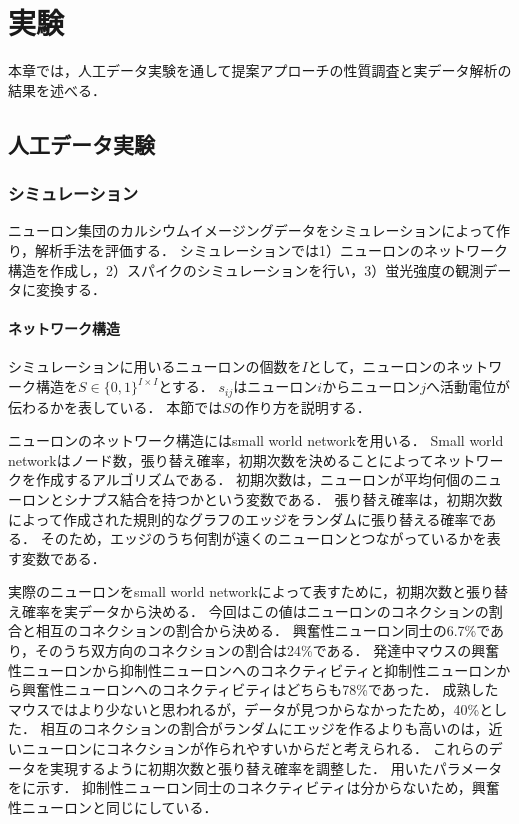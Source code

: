 \chapter{実験}
本章では，人工データ実験を通して提案アプローチの性質調査と実データ解析の結果を述べる．

\section{人工データ実験}
\subsection{シミュレーション}
ニューロン集団のカルシウムイメージングデータをシミュレーションによって作り，解析手法を評価する．
シミュレーションでは1）ニューロンのネットワーク構造を作成し，2）スパイクのシミュレーションを行い，3）蛍光強度の観測データに変換する．
\subsubsection{ネットワーク構造}
シミュレーションに用いるニューロンの個数を$I$として，ニューロンのネットワーク構造を$S \in \{0, 1\}^{I \times I}$とする．
$s_{ij}$はニューロン$i$からニューロン$j$へ活動電位が伝わるかを表している．
本節では$S$の作り方を説明する．

ニューロンのネットワーク構造にはsmall world network\cite{Watts1998}を用いる．
Small world networkはノード数，張り替え確率，初期次数を決めることによってネットワークを作成するアルゴリズムである．
初期次数は，ニューロンが平均何個のニューロンとシナプス結合を持つかという変数である．
張り替え確率は，初期次数によって作成された規則的なグラフのエッジをランダムに張り替える確率である．
そのため，エッジのうち何割が遠くのニューロンとつながっているかを表す変数である．

実際のニューロンをsmall world networkによって表すために，初期次数と張り替え確率を実データから決める．
今回はこの値はニューロンのコネクションの割合と相互のコネクションの割合から決める．
興奮性ニューロン同士の6.7\%であり，そのうち双方向のコネクションの割合は24\%である\cite{Jouhanneau2015}．
発達中マウスの興奮性ニューロンから抑制性ニューロンへのコネクティビティと抑制性ニューロンから興奮性ニューロンへのコネクティビティはどちらも78\%であった\cite{Holmgren2003}．
成熟したマウスではより少ないと思われるが，データが見つからなかったため，40\%とした．
相互のコネクションの割合がランダムにエッジを作るよりも高いのは，近いニューロンにコネクションが作られやすいからだと考えられる．
これらのデータを実現するように初期次数と張り替え確率を調整した．
用いたパラメータをに示す．
抑制性ニューロン同士のコネクティビティは分からないため，興奮性ニューロンと同じにしている．

